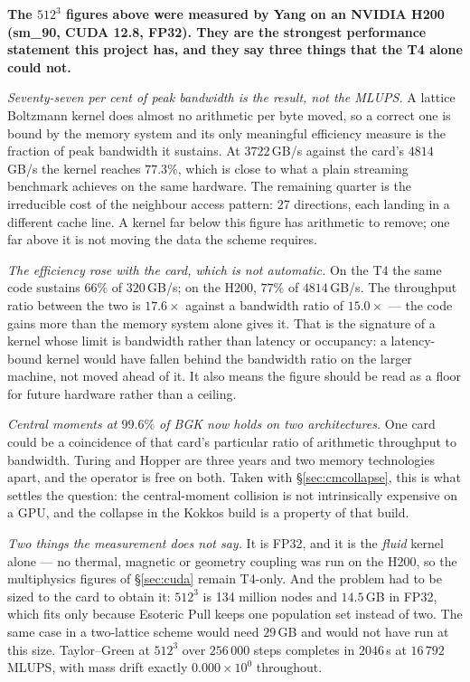 \documentclass[11pt,a4paper]{article}
\newcommand{\e}[1]{\times 10^{#1}}
\begin{document}
{\color{h200red}\bfseries\boldmath
The $512^3$ figures above were measured by Yang on an NVIDIA H200
(sm\_90, CUDA 12.8, FP32). They are the strongest performance statement this
project has, and they say three things that the T4 alone could not.

\medskip
\emph{Seventy-seven per cent of peak bandwidth is the result, not the MLUPS.}
A lattice Boltzmann kernel does almost no arithmetic per byte moved, so a correct
one is bound by the memory system and its only meaningful efficiency measure is
the fraction of peak bandwidth it sustains. At $3722$\,GB/s against the card's
$4814$\,GB/s the kernel reaches $77.3\%$, which is close to what a plain
streaming benchmark achieves on the same hardware. The remaining quarter is the
irreducible cost of the neighbour access pattern: 27 directions, each landing in
a different cache line. A kernel far below this figure has arithmetic to remove;
one far above it is not moving the data the scheme requires.

\medskip
\emph{The efficiency rose with the card, which is not automatic.} On the T4 the
same code sustains $66\%$ of $320$\,GB/s; on the H200, $77\%$ of $4814$\,GB/s.
The throughput ratio between the two is $17.6\times$ against a bandwidth ratio of
$15.0\times$ --- the code gains more than the memory system alone gives it. That
is the signature of a kernel whose limit is bandwidth rather than latency or
occupancy: a latency-bound kernel would have fallen behind the bandwidth ratio on
the larger machine, not moved ahead of it. It also means the figure should be
read as a floor for future hardware rather than a ceiling.

\medskip
\emph{Central moments at $99.6\%$ of BGK now holds on two architectures.} One
card could be a coincidence of that card's particular ratio of arithmetic
throughput to bandwidth. Turing and Hopper are three years and two memory
technologies apart, and the operator is free on both. Taken with
\S\ref{sec:cmcollapse}, this is what settles the question: the central-moment
collision is not intrinsically expensive on a GPU, and the collapse in the Kokkos
build is a property of that build.

\medskip
\emph{Two things the measurement does not say.} It is FP32, and it is the
\emph{fluid} kernel alone --- no thermal, magnetic or geometry coupling was run
on the H200, so the multiphysics figures of \S\ref{sec:cuda} remain T4-only.
And the problem had to be sized to the card to obtain it: $512^3$ is 134 million
nodes and $14.5$\,GB in FP32, which fits only because Esoteric Pull keeps one
population set instead of two. The same case in a two-lattice scheme would need
$29$\,GB and would not have run at this size. Taylor--Green at $512^3$ over
$256\,000$ steps completes in $2046$\,s at $16\,792$ MLUPS, with mass drift
exactly $0.000\e{0}$ throughout.
}
\end{document}
